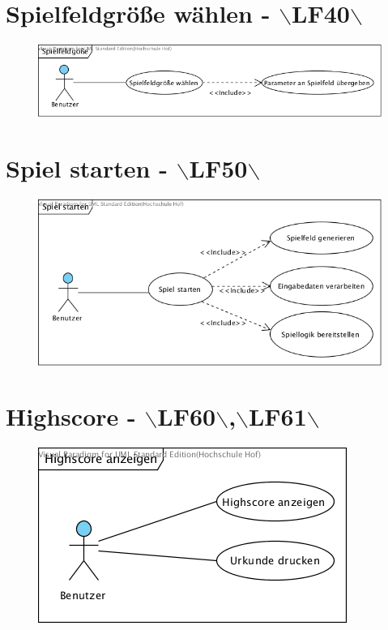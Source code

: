 \clearpage
\section{Spielfeldgröße wählen - $\backslash$LF40$\backslash$}
\begin{figure}[!h]
	\centering
    \includegraphics[width=\textwidth]{./Spielfeldgroesse.png}
	\label{layout_gesamt}
\end{figure}

\clearpage
\section{Spiel starten - $\backslash$LF50$\backslash$}
\begin{figure}[!h]
	\centering
    \includegraphics[width=\textwidth]{./SpielStarten.png}
	\label{layout_gesamt}
\end{figure}

\clearpage
\section{Highscore - $\backslash$LF60$\backslash$,$\backslash$LF61$\backslash$}
\begin{figure}[!h]
	\centering
    \includegraphics[width=\textwidth]{./Highscore.png}
	\label{layout_gesamt}
\end{figure}

